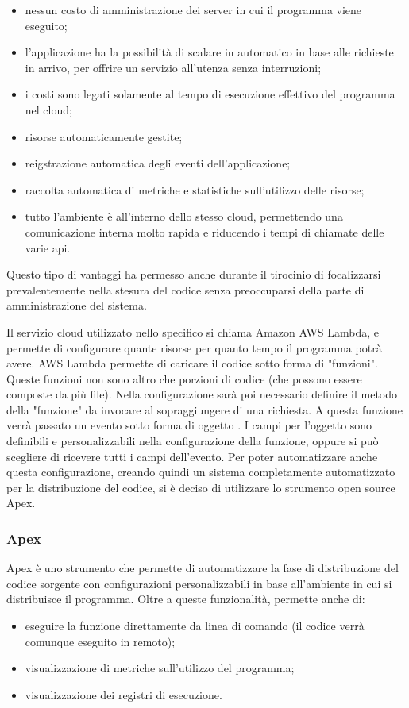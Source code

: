 \begin{itemize}

  \item nessun costo di amministrazione dei server in cui il programma viene
eseguito;
  \item l'applicazione ha la possibilità di scalare in automatico in base alle
richieste in arrivo, per offrire un servizio all'utenza senza interruzioni;
  \item i costi sono legati solamente al tempo di esecuzione effettivo del
programma nel \gls{cloud};
  \item risorse automaticamente gestite;
  \item reigstrazione automatica degli eventi dell'applicazione;
  \item raccolta automatica di metriche e statistiche sull'utilizzo delle
risorse;
  \item tutto l'ambiente è all'interno dello stesso \gls{cloud}, permettendo
una comunicazione interna molto rapida e riducendo i tempi di chiamate delle
varie \gls{api}.
\end{itemize}

Questo tipo di vantaggi ha permesso anche durante il tirocinio di focalizzarsi
prevalentemente nella stesura del codice senza preoccuparsi della parte di
amministrazione del sistema.

Il servizio \gls{cloud} utilizzato nello specifico si chiama Amazon AWS
Lambda, e permette di configurare quante risorse per quanto tempo il programma
potrà avere.
AWS Lambda permette di caricare il codice sotto forma di "funzioni". Queste
funzioni non sono altro che porzioni di codice (che possono essere composte da
più file).
Nella configurazione sarà poi necessario definire il metodo della
"funzione" da invocare al sopraggiungere di una richiesta. A questa funzione
verrà passato un evento sotto forma di oggetto
. I campi per l'oggetto sono
definibili e personalizzabili nella configurazione della funzione, oppure si può
scegliere di ricevere tutti i campi dell'evento.
Per poter automatizzare anche questa configurazione, creando
quindi un sistema completamente automatizzato per la distribuzione del
codice, si è deciso di utilizzare lo strumento open source Apex.

\subsubsection{Apex}
Apex è uno strumento che permette di automatizzare la fase di distribuzione del
codice sorgente con configurazioni personalizzabili in base all'ambiente in cui
si distribuisce il programma. Oltre a queste funzionalità, permette anche di:
\begin{itemize}
  \item eseguire la funzione direttamente da linea di comando (il codice verrà
comunque eseguito in remoto);
  \item visualizzazione di metriche sull'utilizzo del programma;
  \item visualizzazione dei registri di esecuzione.
\end{itemize}

